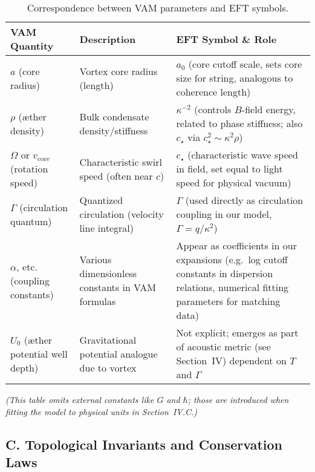 \documentclass[12pt]{article}
\begin{document}
\begin{table}[ht]
    \centering
    \caption{Correspondence between VAM parameters and EFT symbols.}
    \label{tab:correspondence}
    \begin{tabular}{@{}lll@{}}
        \toprule
        \textbf{VAM Quantity} & \textbf{Description} & \textbf{EFT Symbol \& Role} \\
        \midrule
        $a$ (core radius) & Vortex core radius (length) & $a_0$ (core cutoff scale, sets core size for string, analogous to coherence length) \\
        $\rho$ (æther density) & Bulk condensate density/stiffness & $\kappa^{-2}$ (controls $B$-field energy, related to phase stiffness; also $c_\star$ via $c_\star^2 \sim \kappa^2 \rho$) \\
        $\Omega$ or $v_{\text{core}}$ (rotation speed) & Characteristic swirl speed (often near $c$) & $c_\star$ (characteristic wave speed in field, set equal to light speed for physical vacuum) \\
        $\Gamma$ (circulation quantum) & Quantized circulation (velocity line integral) & $\Gamma$ (used directly as circulation coupling in our model, $\Gamma = q/\kappa^2$) \\
        $\alpha$, etc. (coupling constants) & Various dimensionless constants in VAM formulas & Appear as coefficients in our expansions (e.g.\ log cutoff constants in dispersion relations, numerical fitting parameters for matching data) \\
        $U_0$ (æther potential well depth) & Gravitational potential analogue due to vortex & Not explicit; emerges as part of acoustic metric (see Section~IV) dependent on $T$ and $\Gamma$ \\
        \bottomrule
    \end{tabular}
\end{table}

\emph{(This table omits external constants like $G$ and $\hbar$; those are introduced when fitting the model to physical units in Section~IV.C.)}

\subsection*{C. Topological Invariants and Conservation Laws}
\end{document}

